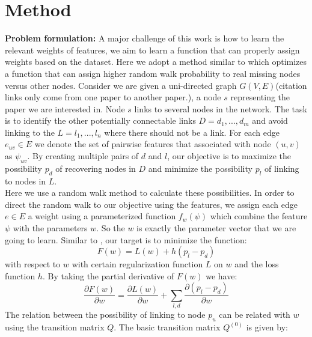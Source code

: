 \documentclass{article} %
\begin{document}
\section{Method}
\textbf{Problem formulation:} A major challenge of this work is how to learn the relevant weights of features, we aim to learn a function that can properly assign weights based on the dataset. Here we adopt a method similar to \cite{Backstrom:2011:SRW:1935826.1935914} which optimizes a function that can assign higher random walk probability to real missing nodes versus other nodes. Consider we are given a uni-directed graph $G(V,E)$(citation links only come from one paper to another paper.), a node $s$ representing the paper we are interested in. Node $s$ links to several nodes in the network. The task is to identify the other potentially connectable links $D={d_1,...,d_m}$ and avoid linking to the $L={l_1,...,l_n}$ where there should not be a link. For each edge $e_{uv}\in E$ we denote the set of pairwise features that associated with node $(u,v)$ as $\psi_{uv}$. By creating multiple pairs of $d$ and $l$, our objective is to maximize the possibility $p_d$ of recovering nodes in $D$ and minimize the possibility $p_l$ of linking to nodes in $L$. \\
	Here we use a random walk method to calculate these possibilities. In order to direct the random walk to our objective using the features, we assign each edge $e \in E$ a weight using a parameterized function $f_w(\psi)$ which combine the feature $\psi$ with the parameters $w$. So the $w$ is exactly the parameter vector that we are going to learn. Similar to \cite{Backstrom:2011:SRW:1935826.1935914}, our target is to minimize the function:
\begin{equation}
F(w)=L(w) + h(p_l - p_d)
\end{equation} 
with respect to $w$ with certain regularization function $L$ on $w$ and the loss function $h$. By taking the partial derivative of $F(w)$ we have:
\begin{equation}
\frac{\partial F(w)}{\partial w} = \frac{\partial L(w)}{\partial w} + \sum_{l,d} \frac{\partial(p_l-p_d)}{\partial w}
\end{equation}
	The relation between the possibility of linking to node $p_u$ can be related with $w$ using the transition matrix $Q$. The basic transition matrix $Q^{(0)}$ is given by:
\end{document}
